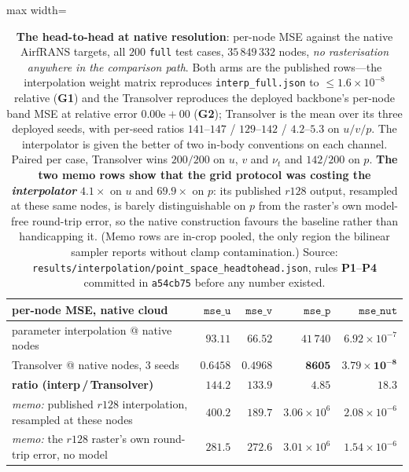 \begin{table}[t]
\centering
\small
\caption{\textbf{The head-to-head at native resolution}: per-node MSE against the native
AirfRANS targets, all $200$ \texttt{full} test cases, $35\,849\,332$ nodes, \emph{no
rasterisation anywhere in the comparison path}. Both arms are the published rows---the
interpolation weight matrix reproduces \texttt{interp\_full.json} to $\le1.6\times10^{-8}$
relative (\textbf{G1}) and the Transolver reproduces the deployed backbone's per-node band
MSE at relative error $0.00\mathrm{e}{+}00$ (\textbf{G2}); Transolver is the mean over its
three deployed seeds, with per-seed ratios $141$--$147$ / $129$--$142$ / $4.2$--$5.3$ on
$u/v/p$. The interpolator is given the better of two in-body conventions on each channel.
Paired per case, Transolver wins $200/200$ on $u$, $v$ and $\nu_t$ and $142/200$ on $p$.
\textbf{The two memo rows show that the grid protocol was costing the \emph{interpolator}}
$4.1\times$ on $u$ and $69.9\times$ on $p$: its published $r128$ output, resampled at these
same nodes, is barely distinguishable on $p$ from the raster's own model-free round-trip
error, so the native construction favours the baseline rather than handicapping it. (Memo
rows are in-crop pooled, the only region the bilinear sampler reports without clamp
contamination.) Source: \texttt{results\slash{}interpolation\slash{}point\_space\_headtohead.json},
rules \textbf{P1}--\textbf{P4} committed in \texttt{a54cb75} before any number existed.}
\label{tab:native}
\begin{adjustbox}{max width=\textwidth}
\begin{tabular}{l r r r r}
\toprule
per-node MSE, native cloud & $\texttt{mse\_u}$ & $\texttt{mse\_v}$ & $\texttt{mse\_p}$ & $\texttt{mse\_nut}$ \\
\midrule
parameter interpolation @ native nodes & $93.11$ & $66.52$ & $41\,740$ & $6.92{\times}10^{-7}$ \\
Transolver @ native nodes, 3 seeds & $\mathbf{0.6458}$ & $\mathbf{0.4968}$ & $\mathbf{8605}$ & $\mathbf{3.79{\times}10^{-8}}$ \\
\midrule
\textbf{ratio (interp\,/\,Transolver)} & $\mathbf{144.2}$ & $\mathbf{133.9}$ & $\mathbf{4.85}$ & $\mathbf{18.3}$ \\
\midrule
\emph{memo:} published $r128$ interpolation, resampled at these nodes & $400.2$ & $189.7$ & $3.06{\times}10^{6}$ & $2.08{\times}10^{-6}$ \\
\emph{memo:} the $r128$ raster's own round-trip error, no model & $281.5$ & $272.6$ & $3.01{\times}10^{6}$ & $1.54{\times}10^{-6}$ \\
\bottomrule
\end{tabular}
\end{adjustbox}
\end{table}

